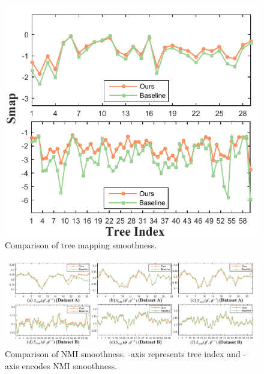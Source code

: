 \begin{figure}[t]
  \vspace{-1mm}
  \centering
  \includegraphics[width=0.7\columnwidth]{fig/v2-Smap-treeindex}
  \vspace{-1mm}
  \caption{
  Comparison of tree mapping smoothness.}
  \vspace{-5mm}
  \label{fig:smap}
\end{figure}

\begin{figure}[b]
	\centering
\vspace{-5mm}
    \includegraphics[width=\linewidth]{fig/v2-nmi-treeindex.pdf}
\vspace{-5mm}
	\caption{
Comparison of NMI smoothness. -axis represents tree index and -axis encodes NMI smoothness.
}\label{fig:NMI}
\vspace{-3mm}
\end{figure}

